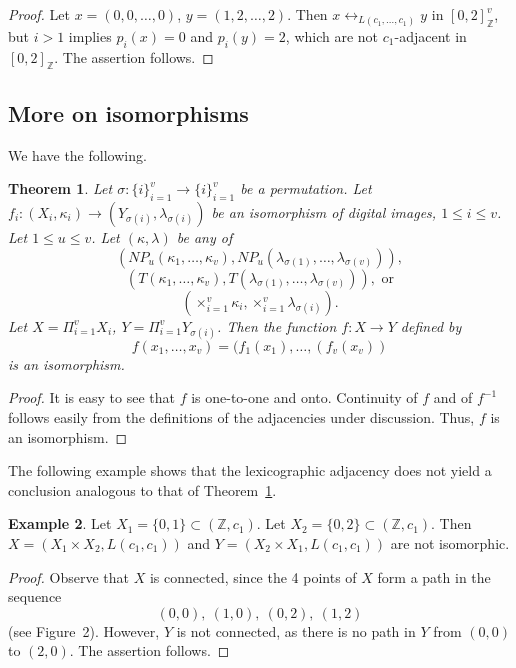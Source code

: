 \documentclass{article}
\theoremstyle{plain}
\newtheorem{thm}{Theorem}
\theoremstyle{definition}
\newtheorem{exl}[thm]{Example}
\numberwithin{thm}{section}
\newcommand{\adj}{\leftrightarrow}
\def\Z{{\mathbb Z}}
\begin{document}
\begin{proof} Let
$x=(0,0,\ldots,0)$, $y=(1,2,\ldots,2)$. Then
$x \adj_{L(c_1,\ldots,c_1)} y$ in
$[0,2]_{\Z}^v$, but $i>1$ implies
$p_i(x)=0$ and $p_i(y)=2$, which 
are not $c_1$-adjacent in $[0,2]_{\Z}$. The assertion follows.
\end{proof}

\subsection{More on isomorphisms}
We have the following.

\begin{thm}
\label{permute}
Let
$\sigma: \{i\}_{i=1}^v \to \{i\}_{i=1}^v$ be a permutation.
Let $f_i: (X_i,\kappa_i) \to (Y_{\sigma(i)},\lambda_{\sigma(i)})$ be an isomorphism
of digital images, $1 \le i \le v$. Let $1 \le u \le v$. 
Let $(\kappa,\lambda)$ be any of
\[(NP_u(\kappa_1,\ldots,\kappa_v),NP_u(\lambda_{\sigma(1)},\ldots,\lambda_{\sigma(v)})), \]
\[(T(\kappa_1,\ldots,\kappa_v),T(\lambda_{\sigma(1)},\ldots,\lambda_{\sigma(v)})), \mbox{ or} \]
\[(\times_{i=1}^v \kappa_i,\times_{i=1}^v \lambda_{\sigma(i)}). \]
Let $X=\Pi_{i=1}^v X_i$, $Y= \Pi_{i=1}^v Y_{\sigma(i)}$.
Then the function
$f: X \to Y$ defined by
\[ f(x_1,\ldots,x_v)=(f_1(x_1), \ldots,(f_v(x_v))
\]
is an isomorphism.
\end{thm}

\begin{proof}
It is easy to see that $f$ is one-to-one and onto. Continuity of $f$ and of 
$f^{-1}$ follows easily from the definitions of the adjacencies under
discussion. Thus, $f$ is an isomorphism.
\end{proof}

The following example shows that the
lexicographic adjacency does not yield
a conclusion analogous to that of 
Theorem~\ref{permute}.

\begin{exl}
\label{pretzel}
Let $X_1 = \{0,1\} \subset (\Z,c_1)$. Let $X_2 = \{0,2\}\subset (\Z,c_1)$. Then $X=(X_1 \times X_2, L(c_1,c_1))$ and $Y=(X_2 \times X_1, L(c_1,c_1))$ are not isomorphic.
\end{exl}

\begin{proof}
Observe that $X$ is connected, since the 4 points of $X$ form a path in the sequence
\[ (0,0),~(1,0),~(0,2),~(1,2)
\]
(see Figure~2).
However, $Y$ is not connected, as there
is no path in $Y$ from $(0,0)$ to $(2,0)$.
The assertion follows.
\end{proof}
\end{document}
